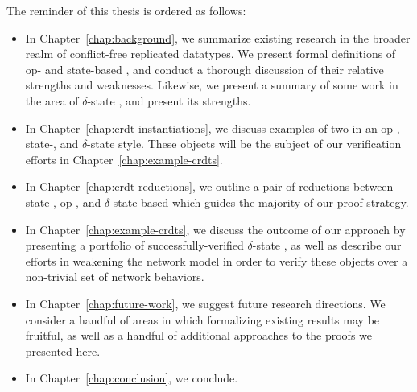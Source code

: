 The reminder of this thesis is ordered as follows:
\begin{itemize}
  \item In Chapter~\ref{chap:background}, we summarize existing research in the
    broader realm of conflict-free replicated datatypes. We present formal
    definitions of op- and state-based \CRDTs, and conduct a thorough discussion
    of their relative strengths and weaknesses. Likewise, we present a summary
    of some work in the area of $\delta$-state \CRDTs, and present its
    strengths.
  \item In Chapter~\ref{chap:crdt-instantiations}, we discuss examples of two
    \CRDTs in an op-, state-, and $\delta$-state style. These objects will be
    the subject of our verification efforts in Chapter~\ref{chap:example-crdts}.
  \item In Chapter~\ref{chap:crdt-reductions}, we outline a pair of reductions
    between state-, op-, and $\delta$-state based \CRDTs which guides the
    majority of our proof strategy.
  \item In Chapter~\ref{chap:example-crdts}, we discuss the outcome of our
    approach by presenting a portfolio of successfully-verified $\delta$-state
    \CRDTs, as well as describe our efforts in weakening the network model in
    order to verify these objects over a non-trivial set of network behaviors.
  \item In Chapter~\ref{chap:future-work}, we suggest future
    research directions. We consider a handful of areas in which formalizing
    existing results may be fruitful, as well as a handful of additional
    approaches to the proofs we presented here.
  \item In Chapter~\ref{chap:conclusion}, we conclude.
\end{itemize}
